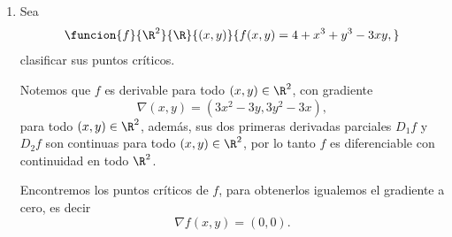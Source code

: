 \documentclass[a4,11pt]{aleph-examen}
\begin{document}
\begin{preguntas}
\begin{respuesta}
\begin{respuesta}
\begin{respuesta}
\begin{enumerate}
\item
    Sea 
    \[
    \funcion{f}{\R^2}{\R}
    {(x,y)}{f(x,y)=4+x^3+y^3-3xy,}
	\]
    clasificar sus puntos críticos.
    
\begin{respuesta}
    Notemos que $f$ es derivable para todo $(x, y)\in\R^2$, con gradiente 
    \[
    \nabla (x,y) = (3x^2-3y,3y^2-3x),
    \]
    para todo $(x, y)\in\R^2$, además, sus dos primeras derivadas parciales $D_1 f$ y $D_2 f$ son continuas para todo $(x, y)\in\R^2$, por lo tanto $f$ es diferenciable con continuidad en todo $\R^2$.
    
    Encontremos los puntos críticos de $f$, para obtenerlos igualemos el gradiente a cero, es decir
    \[
    \nabla f(x,y) = (0, 0).
    \]
    

\end{respuesta}
\end{enumerate}
\end{respuesta}
\end{respuesta}
\end{respuesta}
\end{preguntas}
\end{document}
